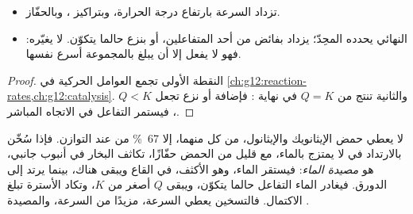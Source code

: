 \begin{proposition}\label{prop:g12:synthesis-strategy:levers}
\begin{itemize}
  \item تزداد السرعة بارتفاع درجة الحرارة، وبتراكيز
        ، وبالحفّاز.
  \item {} النهائي  يحدده 
        المحِدّ؛   يزداد بفائض من
        أحد المتفاعلين، أو بنزع  حالما يتكوّن. 
        لا يغيّره: فهو لا يفعل إلا أن يبلغ بالمجموعة أسرع
         نفسها.
\end{itemize}
\end{proposition}

\begin{proof}
النقطة الأولى تجمع العوامل الحركية في
\cref{ch:g12:reaction-rates,ch:g12:catalysis}. والثانية تنتج من
$Q = K$ في نهاية : فإضافة  أو نزع
 تجعل $Q < K$، فيستمر التفاعل في الاتجاه المباشر.
\end{proof}

\begin{example}\label{ex:g12:synthesis-strategy:trap}
لا يعطي حمض الإيثانويك والإيثانول،  من كل منهما، إلا
\qty{67}{\percent} من  عند التوازن. فإذا سُخّن 
بالارتداد في  لا يمتزج بالماء، مع قليل من
الحمض حفّازًا، تكاثف البخار في أنبوب جانبي، هو \emph{مصيدة
الماء}: فيستقر الماء، وهو الأكثف، في القاع ويبقى هناك، بينما
يرتد  إلى الدورق. فيغادر الماء التفاعل حالما
يتكوّن، ويبقى $Q$ أصغر من $K$، وتكاد الأسترة تبلغ
الاكتمال. فالتسخين يعطي السرعة،  مزيدًا من السرعة، والمصيدة
.
\end{example}

